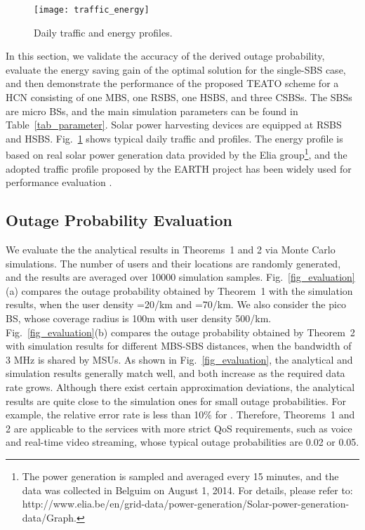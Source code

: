 \documentclass[12pt, draftclsnofoot,onecolumn]{IEEEtran}
\begin{document}
\begin{figure}
  \centering
  \texttt{[image: traffic\_energy]}\\
  \caption{Daily traffic and energy profiles.}\label{fig_traffic_energy}
\end{figure}


In this section, we validate the accuracy of the derived outage probability, evaluate the energy saving gain of the optimal solution for the single-SBS case, and then demonstrate the performance of the proposed TEATO scheme for a HCN consisting of one MBS, one RSBS, one HSBS, and three CSBSs.
The SBSs are micro BSs, and the main simulation parameters can be found in Table~\ref{tab_parameter}.
Solar power harvesting devices are equipped at RSBS and HSBS.
Fig.~\ref{fig_traffic_energy} shows typical daily traffic and profiles.
The energy profile is based on real solar power generation data provided by the Elia group\footnote{The power generation is sampled and averaged every 15 minutes, and the data was collected in Belguim on August 1, 2014. For details, please refer to: http://www.elia.be/en/grid-data/power-generation/Solar-power-generation-data/Graph.}, and the adopted traffic profile proposed by the EARTH project has been widely used for performance evaluation \cite{JGong_TC} \cite{EARTH}.

    \begin{figure*}[!t]
        \centering
        \hfil
        \caption{Outage probability.}
        \label{fig_evaluation}
    \end{figure*}

\subsection{Outage Probability Evaluation}

We evaluate the the analytical results in Theorems~1 and 2 via Monte Carlo simulations.
The number of users and their locations are randomly generated, and the results are averaged over 10000 simulation samples. Fig.~\ref{fig_evaluation}(a) compares the outage probability obtained by Theorem~1 with the simulation results, when the user density =20/km and =70/km. We also consider the pico BS, whose coverage radius is 100m with user density 500/km.
Fig.~\ref{fig_evaluation}(b) compares the outage probability obtained by Theorem~2 with simulation results for different MBS-SBS distances, when the bandwidth of 3 MHz is shared by MSUs.
As shown in Fig.~\ref{fig_evaluation}, the analytical and simulation results generally match well, and both increase as the required data rate grows.
Although there exist certain approximation deviations, the analytical results are quite close to the simulation ones for small outage probabilities.
For example, the relative error rate is less than 10\% for .
Therefore, Theorems~1 and 2 are applicable to the services with more strict QoS requirements, such as voice and real-time video streaming, whose typical outage probabilities are 0.02 or 0.05.
\end{document}
